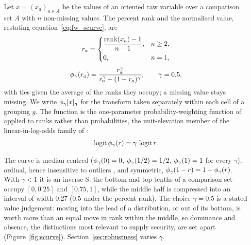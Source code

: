 Let $x=(x_a)_{a\in A}$ be the values of an oriented raw variable over a comparison set $A$ with
$n$ non-missing values. The percent rank and the normalised value, restating
equation~\eqref{eq:fw_scurve}, are
\begin{equation}\label{eq:pct_rank}
  r_a=\begin{cases}
    \dfrac{\operatorname{rank}(x_a)-1}{n-1}, & n\ge 2,\\[6pt]
    0, & n=1,
  \end{cases}
\end{equation}
\begin{equation}\label{eq:scurve}
  \phi_{\gamma}(r_a)=\frac{r_a^{\gamma}}{r_a^{\gamma}+(1-r_a)^{\gamma}},\qquad \gamma=0.5 ,
\end{equation}
with ties given the average of the ranks they occupy; a missing value stays missing. We write
$\phi_{\gamma}[x]_g$ for the transform taken separately within each cell of a grouping $g$. The
function is the one-parameter probability-weighting function of \citet{karmarkar1978subjectively}
applied to ranks rather than probabilities, the unit-elevation member of the linear-in-log-odds
family of \citet{gonzalez1999shape}:
\begin{equation}\label{eq:scurve_logit}
  \operatorname{logit}\phi_{\gamma}(r)=\gamma\,\operatorname{logit}r .
\end{equation}

The curve is median-centred ($\phi_{\gamma}(0)=0$, $\phi_{\gamma}(1/2)=1/2$, $\phi_{\gamma}(1)=1$ for every
$\gamma$), ordinal, hence insensitive to outliers \citep{conover1981rank}, and symmetric,
$\phi_{\gamma}(1-r)=1-\phi_{\gamma}(r)$. With $\gamma<1$ it is an inverse S: the bottom and top tenths of a
comparison set occupy $[0,0.25]$ and $[0.75,1]$, while the middle half is compressed into an
interval of width 0.27 (0.5 under the percent rank). The choice $\gamma=0.5$ is a stated value
judgement: moving into the lead of a distribution, or out of its bottom, is worth more than an
equal move in rank within the middle, so dominance and absence, the distinctions most relevant to
supply security, are set apart (Figure~\ref{fig:scurve}). Section~\ref{sec:robustness} varies
$\gamma$.


